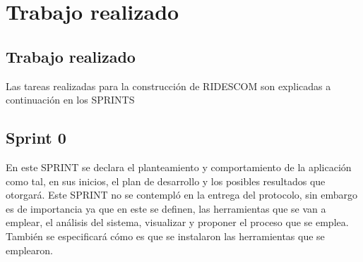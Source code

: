 \chapter{Trabajo realizado}


	\section{Trabajo realizado}
	Las tareas realizadas para la construcción de RIDESCOM son explicadas a continuación en los SPRINTS 
	
	\section{Sprint 0}
	\noindent En este SPRINT se declara el planteamiento y comportamiento de la aplicación como tal, en sus inicios, el plan de desarrollo y los posibles resultados que otorgará.
	Este SPRINT no se contempló en la entrega del protocolo, sin embargo es de importancia ya que en este se definen, las herramientas que se van a emplear, el análisis del sistema, visualizar y proponer el proceso que se emplea.
	También se especificará cómo es que se instalaron las herramientas que se emplearon.
	
